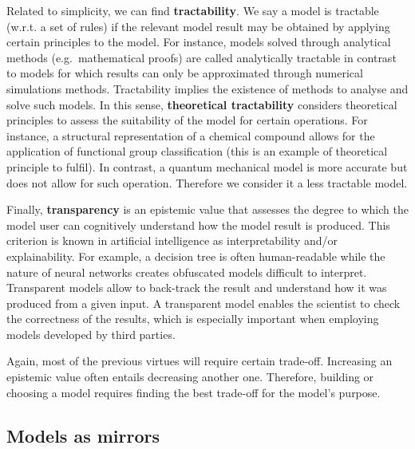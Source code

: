 \documentclass[
]{book}
\begin{document}
Related to simplicity, we can find \textbf{tractability}. We say a model is tractable (w.r.t. a set of rules) if the relevant model result may be obtained by applying certain principles to the model. For instance, models solved through analytical methods (e.g.~mathematical proofs) are called analytically tractable in contrast to models for which results can only be approximated through numerical simulations methods. Tractability implies the existence of methods to analyse and solve such models. In this sense, \textbf{theoretical tractability} considers theoretical principles to assess the suitability of the model for certain operations. For instance, a structural representation of a chemical compound allows for the application of functional group classification (this is an example of theoretical principle to fulfil). In contrast, a quantum mechanical model is more accurate but does not allow for such operation. Therefore we consider it a less tractable model.

Finally, \textbf{transparency} is an epistemic value that assesses the degree to which the model user can cognitively understand how the model result is produced. This criterion is known in artificial intelligence as interpretability and/or explainability. For example, a decision tree is often human-readable while the nature of neural networks creates obfuscated models difficult to interpret. Transparent models allow to back-track the result and understand how it was produced from a given input. A transparent model enables the scientist to check the correctness of the results, which is especially important when employing models developed by third parties.

Again, most of the previous virtues will require certain trade-off. Increasing an epistemic value often entails decreasing another one. Therefore, building or choosing a model requires finding the best trade-off for the model's purpose.

\hypertarget{models-as-mirrors}{%
\subsection{Models as mirrors}\label{models-as-mirrors}}
\end{document}

